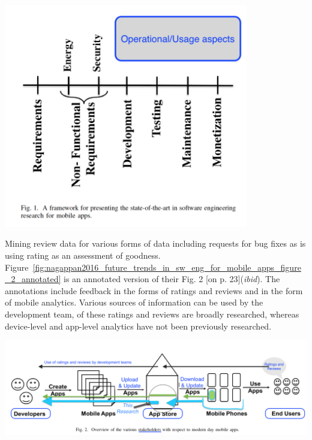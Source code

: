     {\centering
    \includegraphics[width=0.8\textwidth]{images/related-work/future-trends-in-sweng-for-mobile-apps-fig-1-annotated.png}
    \label{fig:nagappan2016_future_trends_in_sw_eng_for_mobile_apps_figure_1_annotated}
    } %

Mining review data for various forms of data including requests for bug fixes as is using rating as an assessment of goodness. 
Figure~\ref{fig:nagappan2016_future_trends_in_sw_eng_for_mobile_apps_figure_2_annotated} is an annotated version of their Fig. 2 [on p. 23](\textit{ibid}). The annotations include feedback in the forms of ratings and reviews and in the form of mobile analytics. Various sources of information can be used by the development team, of these ratings and reviews are broadly researched, whereas device-level and app-level analytics have not been previously researched.

    {\centering
    \includegraphics[width=\textwidth]{images/related-work/future-trends-in-sweng-for-mobile-apps-fig-2-annotated-with-highlights.png}
    \label{fig:nagappan2016_future_trends_in_sw_eng_for_mobile_apps_figure_2_annotated}
    }


